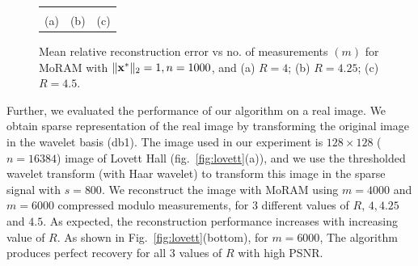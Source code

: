 \begin{figure}[!t]
	\begin{center}
		\begin{tabular}{ccc}
			
			&
			
			&
			 \\
			(a) & (b) & (c) \\
		\end{tabular}
	\end{center}
	\caption{{Mean relative reconstruction error vs no. of measurements $(m)$ for MoRAM with $\|\mathbf{x^*}\|_2=1,n=1000$, and (a) $R=4$; (b) $R=4.25$; (c) $R=4.5$.}}
	\label{fig:plot}
\end{figure}
Further, we evaluated the performance of our algorithm on a real image. We obtain sparse representation of the real image by transforming the original image in the wavelet basis (db1). The image used in our experiment is $128 \times 128$ ($n=16384$) image of Lovett Hall (fig.~\ref{fig:lovett}(a)), and  we use the thresholded wavelet transform (with Haar wavelet) to transform this image in the sparse signal with $s = 800$. We reconstruct the image with MoRAM using $m = 4000$ and $m=6000$ compressed modulo measurements, for $3$ different values of $R$, $4,4.25$ and $4.5$. As expected, the reconstruction performance increases with increasing value of $R$. As shown in Fig.~\ref{fig:lovett}(bottom), for $m=6000$, The algorithm produces perfect recovery for all $3$ values of $R$ with high PSNR.
%


